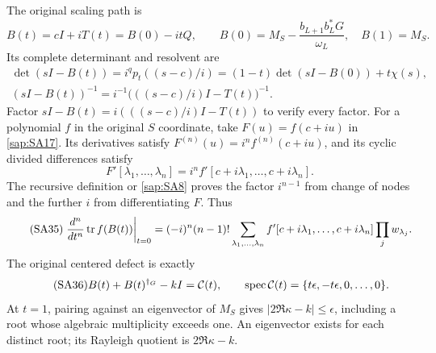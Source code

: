The original scaling path is
\begin{equation}\tag{SA32}\label{sap:SA32}
B(t)=cI+iT(t)=B(0)-itQ,\qquad
B(0)=M_S-\frac{b_{L+1}b_L^*G}{\omega_L},\quad
B(1)=M_S.
\end{equation}
Its complete determinant and resolvent are
\begin{equation}\tag{SA33}\label{sap:SA33}
\begin{gathered}
\det(sI-B(t))=i^qp_t((s-c)/i)
=(1-t)\det(sI-B(0))+t\chi(s),\\
(sI-B(t))^{-1}
=i^{-1}\big(((s-c)/i)I-T(t)\big)^{-1}.
\end{gathered}
\end{equation}
Factor $sI-B(t)=i(((s-c)/i)I-T(t))$ to verify every
factor. For a polynomial $f$ in the original $S$
coordinate, take $F(u)=f(c+iu)$ in \eqref{sap:SA17}.
Its derivatives satisfy $F^{(n)}(u)=i^nf^{(n)}(c+iu)$,
and its cyclic divided differences satisfy
\begin{equation}\tag{SA34}\label{sap:SA34}
F'[\lambda_1,\ldots,\lambda_n]
=i^n f'[c+i\lambda_1,\ldots,c+i\lambda_n].
\end{equation}
The recursive definition or \eqref{sap:SA8} proves the
factor $i^{n-1}$ from change of nodes and the further
$i$ from differentiating $F$. Thus
\begin{equation}\tag{SA35}\label{sap:SA35}
\left.\frac{d^n}{dt^n}\operatorname{tr} f(B(t))\right|_{t=0}
=(-i)^n(n-1)!
\sum_{\lambda_1,\ldots,\lambda_n}
f'[c+i\lambda_1,\ldots,c+i\lambda_n]\prod_jw_{\lambda_j}.
\end{equation}
The original centered defect is exactly
\begin{equation}\tag{SA36}\label{sap:SA36}
B(t)+B(t)^{\dagger_G}-kI
=\mathcal C(t),\qquad
\operatorname{spec}\mathcal C(t)
=\{t\epsilon,-t\epsilon,0,\ldots,0\}.
\end{equation}
At $t=1$, pairing against an eigenvector of $M_S$
gives $|2\Re\kappa-k|\leq\epsilon$, including a root
whose algebraic multiplicity exceeds one. An
eigenvector exists for each distinct root; its
Rayleigh quotient is $2\Re\kappa-k$.

